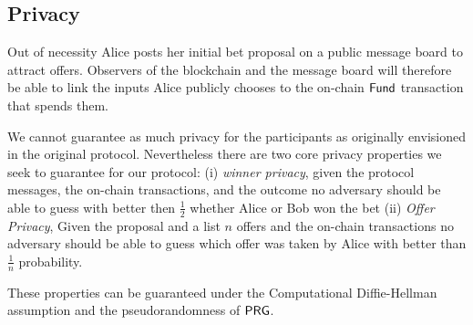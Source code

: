 \documentclass[runningheads]{llncs}
\begin{document}
\subsection{Privacy}

Out of necessity Alice posts her initial bet proposal on a public message board to attract offers. Observers of the blockchain and the message board will therefore be able to link the inputs Alice publicly chooses to the on-chain $\textsf{Fund}$ transaction that spends them.

We cannot guarantee as much privacy for the participants as originally envisioned in the original protocol. Nevertheless there are two core privacy properties we seek to guarantee for our protocol: (i) \emph{winner privacy}, given the protocol messages, the on-chain transactions, and the outcome no adversary should be able to guess with better then  $\frac{1}{2}$ whether Alice or Bob won the bet (ii) \emph{Offer Privacy}, Given the proposal and a list $n$ offers and the on-chain transactions no adversary should be able to guess which offer was taken by Alice with better than $\frac{1}{n}$ probability.

These properties can be guaranteed under the Computational Diffie-Hellman assumption and the pseudorandomness of $\textsf{PRG}$.






\end{document}

